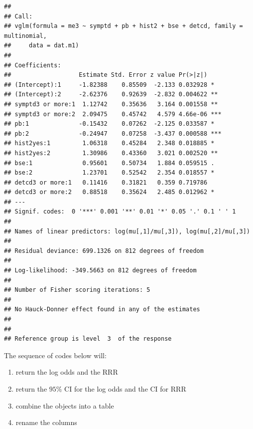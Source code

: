 \documentclass[
  10pt,
]{krantz}
\providecommand{\tightlist}{%
  \setlength{\itemsep}{0pt}\setlength{\parskip}{0pt}}
\begin{document}
\begin{verbatim}
## 
## Call:
## vglm(formula = me3 ~ symptd + pb + hist2 + bse + detcd, family = multinomial, 
##     data = dat.m1)
## 
## Coefficients: 
##                   Estimate Std. Error z value Pr(>|z|)    
## (Intercept):1     -1.82388    0.85509  -2.133 0.032928 *  
## (Intercept):2     -2.62376    0.92639  -2.832 0.004622 ** 
## symptd3 or more:1  1.12742    0.35636   3.164 0.001558 ** 
## symptd3 or more:2  2.09475    0.45742   4.579 4.66e-06 ***
## pb:1              -0.15432    0.07262  -2.125 0.033587 *  
## pb:2              -0.24947    0.07258  -3.437 0.000588 ***
## hist2yes:1         1.06318    0.45284   2.348 0.018885 *  
## hist2yes:2         1.30986    0.43360   3.021 0.002520 ** 
## bse:1              0.95601    0.50734   1.884 0.059515 .  
## bse:2              1.23701    0.52542   2.354 0.018557 *  
## detcd3 or more:1   0.11416    0.31821   0.359 0.719786    
## detcd3 or more:2   0.88518    0.35624   2.485 0.012962 *  
## ---
## Signif. codes:  0 '***' 0.001 '**' 0.01 '*' 0.05 '.' 0.1 ' ' 1
## 
## Names of linear predictors: log(mu[,1]/mu[,3]), log(mu[,2]/mu[,3])
## 
## Residual deviance: 699.1326 on 812 degrees of freedom
## 
## Log-likelihood: -349.5663 on 812 degrees of freedom
## 
## Number of Fisher scoring iterations: 5 
## 
## No Hauck-Donner effect found in any of the estimates
## 
## 
## Reference group is level  3  of the response
\end{verbatim}

The sequence of codes below will:

\begin{enumerate}
\def\labelenumi{\arabic{enumi}.}
\tightlist
\item
  return the log odds and the RRR
\item
  return the \(95\%\) CI for the log odds and the CI for RRR
\item
  combine the objects into a table
\item
  rename the columns
\end{enumerate}
\end{document}
